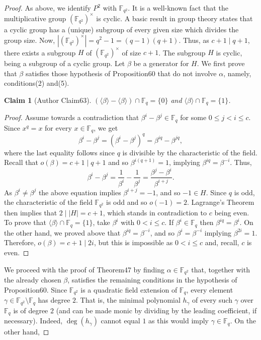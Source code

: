 \documentclass[10pt,a4paper]{article}
\newtheorem{ntclaim}[nttheorem]{Claim}
\begin{document}
\begin{proof}
As above, we identify $P^2$ with $\mathbb F_{q^2}$. It is a well-known fact that the multiplicative group $(\mathbb F_{q^2})^\times$ is cyclic. A basic result in group theory states that a cyclic group has a (unique) subgroup of every given size which divides the group size. Now, $|(\mathbb F_{q^2})^\times|=q^2-1=(q-1)(q+1)$. Thus, as $c+1\mid q+1$, there exists a subgroup $H$ of $(\mathbb F_{q^2})^\times$ of size $c+1$. The subgroup $H$ is cyclic, being a subgroup of a cyclic group. Let $\beta$ be a generator for $H$. We first prove that $\beta$ satisfies those hypothesis of Proposition60 that do not involve $\alpha$, namely, conditions(2) and(5).
\begin{ntclaim}[Author Claim63]
$(\langle\beta\rangle-\langle\beta\rangle)\cap\mathbb F_q=\{0\}$ and $\langle\beta\rangle\cap\mathbb F_q=\{1\}$.
\end{ntclaim}
\begin{proof}
Assume towards a contradiction that $\beta^i-\beta^j\in\mathbb F_q$ for some $0\leq j<i\leq c$. Since $x^q=x$ for every $x\in\mathbb F_q$, we get
\[\beta^i-\beta^j=(\beta^i-\beta^j)^q=\beta^{iq}-\beta^{jq},\]
where the last equality follows since $q$ is divisible by the characteristic of the field. Recall that $o(\beta)=c+1\mid q+1$ and so $\beta^{i(q+1)}=1$, implying $\beta^{iq}=\beta^{-i}$. Thus,
\[\beta^i-\beta^j=\frac1{\beta^i}-\frac1{\beta^j}=\frac{\beta^j-\beta^i}{\beta^{i+j}}.\]
As $\beta^i\ne\beta^j$ the above equation implies $\beta^{i+j}=-1$, and so $-1\in H$. Since $q$ is odd, the characteristic of the field $\mathbb F_{q^2}$ is odd and so $o(-1)=2$. Lagrange's Theorem then implies that $2\mid|H|=c+1$, which stands in contradiction to $c$ being even.
To prove that $\langle\beta\rangle\cap\mathbb F_q=\{1\}$, take $\beta^i$ with $0<i\leq c$. If $\beta^i\in\mathbb F_q$ then $\beta^{iq}=\beta^i$. On the other hand, we proved above that $\beta^{iq}=\beta^{-i}$, and so $\beta^i=\beta^{-i}$ implying $\beta^{2i}=1$. Therefore, $o(\beta)=c+1\mid2i$, but this is impossible as $0<i\leq c$ and, recall, $c$ is even.
\end{proof}
We proceed with the proof of Theorem47 by finding $\alpha\in\mathbb F_{q^2}$ that, together with the already chosen $\beta$, satisfies the remaining conditions in the hypothesis of Proposition60. Since $\mathbb F_{q^2}$ is a quadratic field extension of $\mathbb F_q$, every element $\gamma\in\mathbb F_{q^2}\setminus\mathbb F_q$ has degree $2$. That is, the minimal polynomial $h_\gamma$ of every such $\gamma$ over $\mathbb F_q$ is of degree $2$ (and can be made monic by dividing by the leading coefficient, if necessary). Indeed, $\deg(h_\gamma)$ cannot equal $1$ as this would imply $\gamma\in\mathbb F_q$. On the other hand,

\end{proof}
\end{document}
